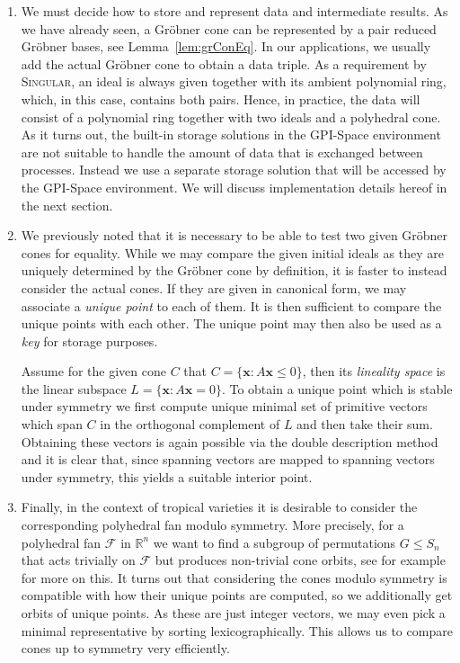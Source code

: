 \documentclass[
  paper=a4,
  titlepage,
  bibliography=totoc,
  pagesize=pdftex
]{scrartcl}
\numberwithin{figure}{section}
\numberwithin{equation}{section}
\numberwithin{table}{section}
\newcommand*\setR{\mathds{R}}
\let\vec\mathbf
\theoremstyle{definition}
\numberwithin{definition}{section}
\begin{document}
\begin{enumerate}[label=\arabic*.]
  \item We must decide how to store and represent data and intermediate results. As we
    have already seen, a Gröbner cone can be represented by a pair reduced Gröbner bases,
    see Lemma~\ref{lem:grConEq}. In our applications, we usually add the actual Gröbner
    cone to obtain a data triple. As a requirement by \textsc{Singular}, an ideal is
    always given together with its ambient polynomial ring, which, in this case, contains
    both pairs. Hence, in practice, the data will consist of a polynomial ring together
    with two ideals and a polyhedral cone. As it turns out, the built-in storage solutions
    in the GPI-Space environment are not suitable to handle the amount of data that is
    exchanged between processes. Instead we use a separate storage solution that will be
    accessed by the GPI-Space environment. We will discuss implementation details hereof
    in the next section.
  \item We previously noted that it is necessary to be able to test two given Gröbner
    cones for equality. While we may compare the given initial ideals as they are uniquely
    determined by the Gröbner cone by definition, it is faster to instead consider the
    actual cones. If they are given in canonical form, we may associate a \emph{unique
    point} to each of them. It is then sufficient to compare the unique points with each
    other. The unique point may then also be used as a \emph{key} for storage purposes.

    Assume for the given cone $C$ that $C = \{ \vec x : A\vec x \leq 0 \}$, then its
    \emph{lineality space} is the linear subspace $L = \{ \vec x : A\vec x=0 \}$. To
    obtain a unique point which is stable under symmetry we first compute unique minimal
    set of primitive vectors which span $C$ in the orthogonal complement of $L$ and then
    take their sum. Obtaining these vectors is again possible via the double description
    method \cite{fuDD} and it is clear that, since spanning vectors are mapped to
    spanning vectors under symmetry, this yields a suitable interior point.
  \item Finally, in the context of tropical varieties it is desirable to consider the
    corresponding polyhedral fan modulo symmetry. More precisely, for a polyhedral fan
    $\mathcal F$ in $\setR^n$ we want to find a subgroup of permutations $G \leq S_n$ that
    acts trivially on $\mathcal F$ but produces non-trivial cone orbits, see for example
    \cite{JenTravSym} for more on this. It turns out that considering the cones modulo
    symmetry is compatible with how their unique points are computed, so we additionally
    get orbits of unique points. As these are just integer vectors, we may even pick a
    minimal representative by sorting lexicographically. This allows us to compare cones
    up to symmetry very efficiently.
\end{enumerate}
\end{document}
